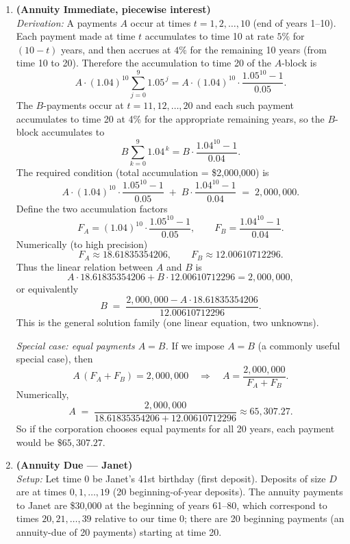 \documentclass[11pt]{article}
\begin{document}
\begin{enumerate}[leftmargin=*,itemsep=16pt]

\item \textbf{(Annuity Immediate, piecewise interest)}\\[4pt]
  \emph{Derivation:} A payments \(A\) occur at times \(t=1,2,\dots,10\) (end of years 1–10). Each payment made at time \(t\) accumulates to time 10 at rate \(5\%\) for \((10-t)\) years, and then accrues at \(4\%\) for the remaining 10 years (from time 10 to 20). Therefore the accumulation to time 20 of the \(A\)-block is
  \[
    A\cdot(1.04)^{10}\sum_{j=0}^{9}1.05^{\,j}
    =A\cdot(1.04)^{10}\cdot\frac{1.05^{10}-1}{0.05}.
  \]
  The \(B\)-payments occur at \(t=11,12,\dots,20\) and each such payment accumulates to time 20 at 4\% for the appropriate remaining years, so the \(B\)-block accumulates to
  \[
    B\sum_{k=0}^{9}1.04^{\,k}=B\cdot\frac{1.04^{10}-1}{0.04}.
  \]
  The required condition (total accumulation = \$2,000,000) is
  \[
    A\cdot(1.04)^{10}\cdot\frac{1.05^{10}-1}{0.05}
    \;+\;
    B\cdot\frac{1.04^{10}-1}{0.04}
    \;=\;2{,}000{,}000.
  \]
  Define the two accumulation factors
  \[
    F_A=(1.04)^{10}\cdot\frac{1.05^{10}-1}{0.05},\qquad
    F_B=\frac{1.04^{10}-1}{0.04}.
  \]
  Numerically (to high precision)
  \[
    F_A\approx 18.61835354206,\qquad F_B\approx 12.00610712296.
  \]
  Thus the linear relation between \(A\) and \(B\) is
  \[
    A\cdot 18.61835354206 + B\cdot 12.00610712296 = 2{,}000{,}000,
  \]
  or equivalently
  \[
    B \;=\; \frac{2{,}000{,}000 - A\cdot 18.61835354206}{12.00610712296}.
  \]
  This is the general solution family (one linear equation, two unknowns).

  \smallskip
  \emph{Special case: equal payments \(A=B\).} If we impose \(A=B\) (a commonly useful special case), then
  \[
    A\,(F_A+F_B)=2{,}000{,}000 \quad\Rightarrow\quad
    A=\frac{2{,}000{,}000}{F_A+F_B}.
  \]
  Numerically,
  \[
    A \;=\; \frac{2{,}000{,}000}{18.61835354206 + 12.00610712296}
      \approx 65{,}307.27.
  \]
  So if the corporation chooses equal payments for all 20 years, each payment would be \(\boxed{\$65{,}307.27}\).

\bigskip

\item \textbf{(Annuity Due — Janet)}\\[4pt]
  \emph{Setup:} Let time \(0\) be Janet's 41st birthday (first deposit). Deposits of size \(D\) are at times \(0,1,\dots,19\) (20 beginning-of-year deposits). The annuity payments to Janet are \$30,000 at the beginning of years 61–80, which correspond to times \(20,21,\dots,39\) relative to our time 0; there are 20 beginning payments (an annuity-due of 20 payments) starting at time 20.


\end{enumerate}
\end{document}
